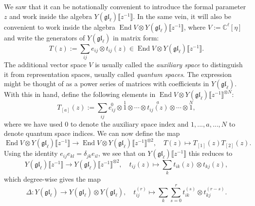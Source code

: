 \documentclass[11pt]{report}
\theoremstyle{definition}
\theoremstyle{remark}
\theoremstyle{remark}
\newcommand{\End}{\operatorname{End}}
\newcommand{\C}{\mathbb{C}}
\begin{document}
We saw that it can be notationally convenient to introduce the formal parameter $z$ and work inside the algebra $Y(\mathfrak{gl}_\ell)\llbracket z^{-1} \rrbracket$. In the same vein, it will also be convenient to work inside the algebra $\End V \otimes Y(\mathfrak{gl}_\ell)\llbracket z^{-1} \rrbracket$, where $V := \C^\ell[\eta]$ and write the generators of $Y(\mathfrak{gl}_\ell)$ in matrix form:
\begin{equation*}
T(z) := \sum_{ij} e_{ij} \otimes t_{ij}(z) \in \End V \otimes Y(\mathfrak{gl}_\ell)\llbracket z^{-1} \rrbracket.
\end{equation*}
The additional vector space $V$ is usually called the \emph{auxiliary space} to distinguish it from representation spaces, usually called \emph{quantum spaces}. The expression might be thought of as a power series of matrices with coefficients in $Y(\mathfrak{gl}_\ell)$. With this in hand, define the following elements in $\End V \otimes Y(\mathfrak{gl}_\ell)\llbracket z^{-1} \rrbracket^{\otimes N}$:
\begin{equation*}
T_{[a]}(z) := \sum_{ij} \overset{0}{e_{ij}} \otimes \overset{1}{1} \otimes \cdots \otimes \overset{a}{t_{ij}(z)} \otimes \cdots \otimes \overset{N}{1},
\end{equation*}
where we have used $0$ to denote the auxiliary space index and $1,...,a,...,N$ to denote quantum space indices. We can now define the map
\begin{equation*}
\End V \otimes Y(\mathfrak{gl}_\ell)\llbracket z^{-1} \rrbracket \to \End V \otimes Y(\mathfrak{gl}_\ell)\llbracket z^{-1} \rrbracket^{\otimes 2}, \quad T(z) \mapsto T_{[1]}(z) T_{[2]}(z).
\end{equation*}
Using the identity $e_{ij} e_{kl} = \delta_{jk} e_{il}$, we see that on $Y(\mathfrak{gl}_\ell)\llbracket z^{-1} \rrbracket$ this reduces to
\begin{equation*}
Y(\mathfrak{gl}_\ell)\llbracket z^{-1} \rrbracket \to Y(\mathfrak{gl}_\ell)\llbracket z^{-1} \rrbracket^{\otimes 2}, \quad t_{ij}(z) \mapsto \sum_k t_{ik}(z) \otimes t_{kj}(z),
\end{equation*}
which degree-wise gives the map
\begin{equation}\label{equation:coproduct}
\Delta: Y(\mathfrak{gl}_\ell) \to Y(\mathfrak{gl}_\ell) \otimes Y(\mathfrak{gl}_\ell), \quad t_{ij}^{(r)} \mapsto \sum_k \sum_{s=0}^r t_{ik}^{(s)} \otimes t_{kj}^{(r-s)}.
\end{equation}
\end{document}

